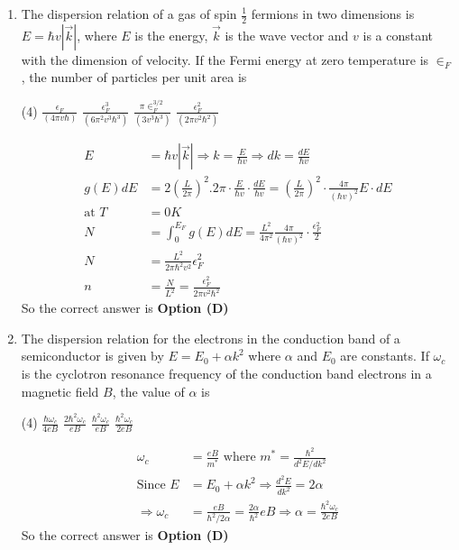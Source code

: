 \begin{enumerate}
\begin{answer}
\end{answer}
	\item The dispersion relation of a gas of spin $\frac{1}{2}$ fermions in two dimensions is $E=\hbar v|\vec{k}|$, where $E$ is the energy, $\vec{k}$ is the wave vector and $v$ is a constant with the dimension of velocity. If the Fermi energy at zero temperature is $\in_{F}$, the number of particles per unit area is
	{}
\begin{tasks}(4)
\task[\textbf{A.}] $\frac{\epsilon_{F}}{(4 \pi v \hbar)}$
\task[\textbf{B.}] $\frac{\epsilon_{F}^{3}}{\left(6 \pi^{2} v^{3} \hbar^{3}\right)}$
\task[\textbf{C.}] $\frac{\pi \in_{F}^{3 / 2}}{\left(3 v^{3} \hbar^{3}\right)}$
\task[\textbf{D.}] $\frac{\epsilon_{F}^{2}}{\left(2 \pi v^{2} \hbar^{2}\right)}$
\end{tasks}
\begin{answer}
\begin{align*}
E&=\hbar v|\vec{k}| \Rightarrow k=\frac{E}{\hbar v} \Rightarrow d k=\frac{d E}{\hbar v}\\
g(E) d E&=2\left(\frac{L}{2 \pi}\right)^{2} .2 \pi \cdot \frac{E}{\hbar v} \cdot \frac{d E}{\hbar v}=\left(\frac{L}{2 \pi}\right)^{2} \cdot \frac{4 \pi}{(\hbar v)^{2}} E \cdot d E\\
\text{at }T&=0 K\\
N&=\int_{0}^{E_{F}} g(E) d E=\frac{L^{2}}{4 \pi^{2}} \frac{4 \pi}{(\hbar v)^{2}} \cdot \frac{\epsilon_{F}^{2}}{2}\\
N&=\frac{L^{2}}{2 \pi \hbar^{2} v^{2}} \epsilon_{F}^{2}\\
n&=\frac{N}{L^{2}}=\frac{\epsilon_{F}^{2}}{2 \pi v^{2} \hbar^{2}}
\end{align*}
So the correct answer is \textbf{Option (D)}
\end{answer}
	\item The dispersion relation for the electrons in the conduction band of a semiconductor is given by $E=E_{0}+\alpha k^{2}$ where $\alpha$ and $E_{0}$ are constants. If $\omega_{c}$ is the cyclotron resonance frequency of the conduction band electrons in a magnetic field $B$, the value of $\alpha$ is
	{}
\begin{tasks}(4)
\task[\textbf{A.}] $\frac{\hbar \omega_{c}}{4 e B}$
\task[\textbf{B.}] $\frac{2 \hbar^{2} \omega_{c}}{e B}$
\task[\textbf{C.}] $\frac{\hbar^{2} \omega_{c}}{e B}$
\task[\textbf{D.}]  $\frac{\hbar^{2} \omega_{c}}{2 e B}$
\end{tasks}
\begin{answer}
\begin{align*}
\omega_{c}&=\frac{e B}{m^{*}}\text{ where }m^{*}=\frac{\hbar^{2}}{d^{2} E / d k^{2}}\\
\text{Since }E&=E_{0}+\alpha k^{2} \Rightarrow \frac{d^{2} E}{d k^{2}}=2 \alpha\\
\Rightarrow \omega_{c}&=\frac{e B}{\hbar^{2} / 2 \alpha}=\frac{2 \alpha}{\hbar^{2}} e B \Rightarrow \alpha=\frac{\hbar^{2} \omega_{c}}{2 e B}
\end{align*}
So the correct answer is \textbf{Option (D)}
\end{answer}
\end{enumerate}
